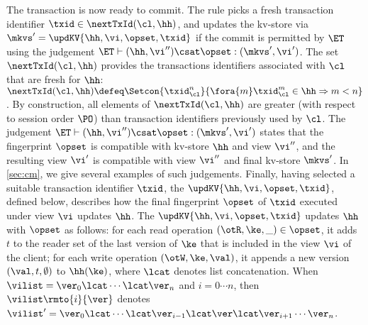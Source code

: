 The transaction is now ready to commit. The rule picks a fresh transaction identifier $\txid \in \nextTxId(\cl, \hh)$, 
and updates the kv-store via $\mkvs' = \updKV{\hh, \vi, \opset, \txid}$
if the commit is permitted by $\ET$ using the judgement $\ET \vdash (\hh, \vi'') \csat \opset : (\mkvs', \vi')$.
The set $\nextTxId(\cl, \hh)$ provides the transactions identifiers
associated with $\cl$ that are fresh for  $\hh$:
$
\nextTxId(\cl, \hh) \defeq \Setcon{\txid_{\cl}^{n}}{\fora{m}
  \txid_{\cl}^{m} \in \hh \Rightarrow m < n }
$.
By construction, all elements of $\nextTxId(\cl, \hh)$ are greater (with respect to session order $\PO$) 
than transaction identifiers previously used by $\cl$. 
The judgement $\ET \vdash (\hh, \vi'') \csat \opset : (\mkvs', \vi')$
states that the fingerprint $\opset$ is compatible with kv-store $\hh$
and view $\vi''$, and the resulting view $\vi'$ 
is compatible with view \( \vi'' \) and final kv-store \( \mkvs' \).
In \cref{sec:cm}, we give several examples of such judgements.
Finally, having selected a suitable transaction identifier $\txid$,
the $\updKV{\hh, \vi, \opset, \txid}$, defined below, describes how the final fingerprint $\opset$ of $\txid$ executed 
under view $\vi$ updates $\hh$. 
The $\updKV{\hh, \vi, \opset, \txid}$ updates $\hh$ with $\opset$ as follows: 
for each read operation $(\otR, \ke, \_) \in \opset$, it adds $t$ 
to the reader set of the last version of $\ke$ that is included in the view $\vi$ of the client; 
for each write operation $(\otW, \ke, \val)$, it appends a new version $(\val, t, \emptyset)$ 
to $\hh(\ke)$, where $\lcat$ denotes list concatenation.
When $\vilist = \ver_0 \lcat \cdots \lcat \ver_n$ and $i=0 \cdots n$, 
then $\vilist\rmto{i}{\ver}$ denotes 
$\vilist' = \ver_0 \lcat \cdots \lcat \ver_{i-1} \lcat \ver \lcat \ver_{i+1} \cdots \ver_{n}$. 

